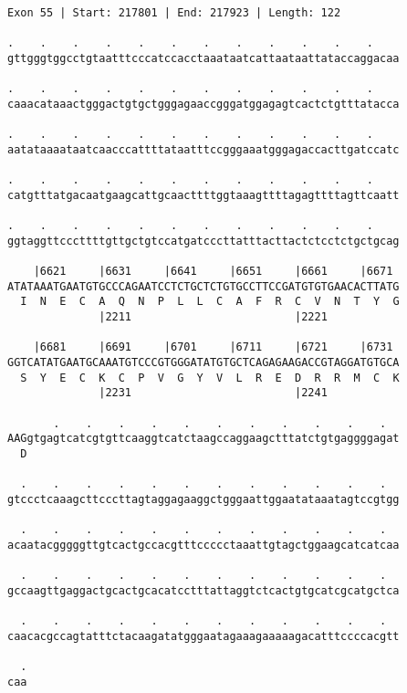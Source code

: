 \documentclass{article}
\begin{document}
\begin{Verbatim}[fontfamily=courier]
Exon 55 | Start: 217801 | End: 217923 | Length: 122

.    .    .    .    .    .    .    .    .    .    .    .    
gttgggtggcctgtaatttcccatccacctaaataatcattaataattataccaggacaa

.    .    .    .    .    .    .    .    .    .    .    .    
caaacataaactgggactgtgctgggagaaccgggatggagagtcactctgtttatacca

.    .    .    .    .    .    .    .    .    .    .    .    
aatataaaataatcaacccattttataatttccgggaaatgggagaccacttgatccatc

.    .    .    .    .    .    .    .    .    .    .    .    
catgtttatgacaatgaagcattgcaacttttggtaaagttttagagttttagttcaatt

.    .    .    .    .    .    .    .    .    .    .    .    
ggtaggttcccttttgttgctgtccatgatcccttatttacttactctcctctgctgcag

    |6621     |6631     |6641     |6651     |6661     |6671 
ATATAAATGAATGTGCCCAGAATCCTCTGCTCTGTGCCTTCCGATGTGTGAACACTTATG
  I  N  E  C  A  Q  N  P  L  L  C  A  F  R  C  V  N  T  Y  G
              |2211                         |2221           

    |6681     |6691     |6701     |6711     |6721     |6731 
GGTCATATGAATGCAAATGTCCCGTGGGATATGTGCTCAGAGAAGACCGTAGGATGTGCA
  S  Y  E  C  K  C  P  V  G  Y  V  L  R  E  D  R  R  M  C  K
              |2231                         |2241           

       .    .    .    .    .    .    .    .    .    .    .  
AAGgtgagtcatcgtgttcaaggtcatctaagccaggaagctttatctgtgaggggagat
  D                                                         

  .    .    .    .    .    .    .    .    .    .    .    .  
gtccctcaaagcttcccttagtaggagaaggctgggaattggaatataaatagtccgtgg

  .    .    .    .    .    .    .    .    .    .    .    .  
acaatacgggggttgtcactgccacgtttccccctaaattgtagctggaagcatcatcaa

  .    .    .    .    .    .    .    .    .    .    .    .  
gccaagttgaggactgcactgcacatcctttattaggtctcactgtgcatcgcatgctca

  .    .    .    .    .    .    .    .    .    .    .    .  
caacacgccagtatttctacaagatatgggaatagaaagaaaaagacatttccccacgtt

  .
caa
\end{Verbatim}
\newpage
\end{document}
